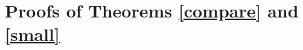 \section{Proofs of Theorems \ref{compare} and \ref{small}}
\label{sec:problem_setup_additional}






